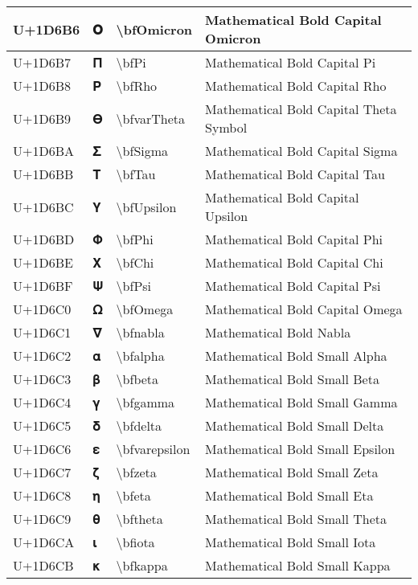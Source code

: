 \begin{table}[h]
\begin{tabulary}{\linewidth}{|L|L|L|L|}
\hline
U+1D6B6 & 𝚶 & {\textbackslash}bfOmicron & Mathematical Bold Capital Omicron \\
\hline
U+1D6B7 & 𝚷 & {\textbackslash}bfPi & Mathematical Bold Capital Pi \\
\hline
U+1D6B8 & 𝚸 & {\textbackslash}bfRho & Mathematical Bold Capital Rho \\
\hline
U+1D6B9 & 𝚹 & {\textbackslash}bfvarTheta & Mathematical Bold Capital Theta Symbol \\
\hline
U+1D6BA & 𝚺 & {\textbackslash}bfSigma & Mathematical Bold Capital Sigma \\
\hline
U+1D6BB & 𝚻 & {\textbackslash}bfTau & Mathematical Bold Capital Tau \\
\hline
U+1D6BC & 𝚼 & {\textbackslash}bfUpsilon & Mathematical Bold Capital Upsilon \\
\hline
U+1D6BD & 𝚽 & {\textbackslash}bfPhi & Mathematical Bold Capital Phi \\
\hline
U+1D6BE & 𝚾 & {\textbackslash}bfChi & Mathematical Bold Capital Chi \\
\hline
U+1D6BF & 𝚿 & {\textbackslash}bfPsi & Mathematical Bold Capital Psi \\
\hline
U+1D6C0 & 𝛀 & {\textbackslash}bfOmega & Mathematical Bold Capital Omega \\
\hline
U+1D6C1 & 𝛁 & {\textbackslash}bfnabla & Mathematical Bold Nabla \\
\hline
U+1D6C2 & 𝛂 & {\textbackslash}bfalpha & Mathematical Bold Small Alpha \\
\hline
U+1D6C3 & 𝛃 & {\textbackslash}bfbeta & Mathematical Bold Small Beta \\
\hline
U+1D6C4 & 𝛄 & {\textbackslash}bfgamma & Mathematical Bold Small Gamma \\
\hline
U+1D6C5 & 𝛅 & {\textbackslash}bfdelta & Mathematical Bold Small Delta \\
\hline
U+1D6C6 & 𝛆 & {\textbackslash}bfvarepsilon & Mathematical Bold Small Epsilon \\
\hline
U+1D6C7 & 𝛇 & {\textbackslash}bfzeta & Mathematical Bold Small Zeta \\
\hline
U+1D6C8 & 𝛈 & {\textbackslash}bfeta & Mathematical Bold Small Eta \\
\hline
U+1D6C9 & 𝛉 & {\textbackslash}bftheta & Mathematical Bold Small Theta \\
\hline
U+1D6CA & 𝛊 & {\textbackslash}bfiota & Mathematical Bold Small Iota \\
\hline
U+1D6CB & 𝛋 & {\textbackslash}bfkappa & Mathematical Bold Small Kappa \\

\end{tabulary}
\end{table}
